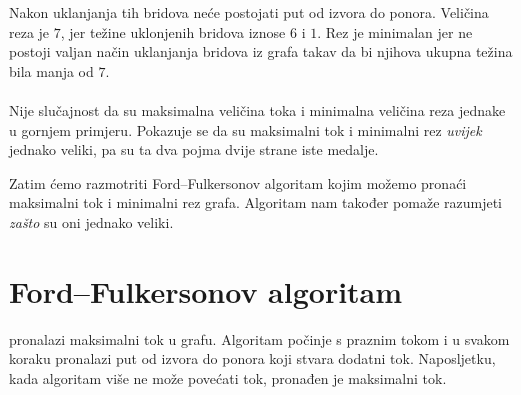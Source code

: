 \begin{center}
\end{center}

Nakon uklanjanja tih bridova
neće postojati put od izvora do ponora.
Veličina reza je $7$,
jer težine uklonjenih bridova
iznose $6$ i $1$.
Rez je minimalan jer ne postoji valjan
način uklanjanja bridova iz grafa takav da
bi njihova ukupna težina bila manja od $7$.
\\\\
Nije slučajnost da su
maksimalna veličina toka
i minimalna veličina reza
jednake u gornjem primjeru.
Pokazuje se da su maksimalni tok
i minimalni rez
\emph{uvijek} jednako veliki,
pa su ta dva pojma dvije strane iste medalje.

Zatim ćemo razmotriti Ford–Fulkersonov
algoritam kojim možemo pronaći
maksimalni tok i minimalni rez grafa.
Algoritam nam također pomaže razumjeti
\emph{zašto} su oni jednako veliki.

\section{Ford–Fulkersonov algoritam}


 \cite{for56} pronalazi
maksimalni tok u grafu.
Algoritam počinje s praznim tokom
i u svakom koraku pronalazi put od izvora
do ponora koji stvara dodatni tok.
Naposljetku, kada algoritam više ne može povećati tok,
pronađen je maksimalni tok.

